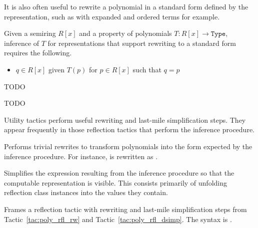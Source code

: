 It is also often useful to rewrite a polynomial in a standard form defined by the representation, such as with expanded and ordered terms for example.

\begin{definition}
\label{def:FormReflection}
\leanok
Given a semiring $R[x]$ and a property of polynomials $T:R[x] \to \mathtt{Type}$, inference of $T$ for representations that support rewriting to a standard form requires the following.
\begin{itemize}
\item $q \in R[x]$ given $T(p)$ for $p \in R[x]$ such that $q = p$
\end{itemize}
\end{definition}


TODO


TODO

\label{sec:tactics}


Utility tactics perform useful rewriting and last-mile simplification steps. They appear frequently in those reflection tactics that perform the inference procedure.

\begin{tactic}
\label{tac:poly_rfl_rw}
\leanok
Performs trivial rewrites to transform polynomials into the form expected by the inference procedure. For instance,  is rewritten as .
\end{tactic}

\begin{tactic}
\label{tac:poly_rfl_dsimp}
\leanok
{}
Simplifies the expression resulting from the inference procedure so that the computable representation is visible. This consists primarily of unfolding reflection class instances into the values they contain.
\end{tactic}

\begin{tactic}
\label{tac:poly_rfl_with}
\leanok
{}
Frames a reflection tactic  with rewriting and last-mile simplification steps from Tactic~\ref{tac:poly_rfl_rw} and Tactic~\ref{tac:poly_rfl_dsimp}. The syntax is \leaninline{ <:> }.
\end{tactic}

